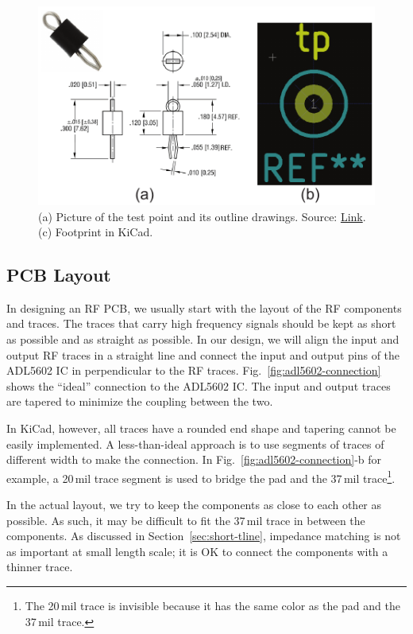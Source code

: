 \documentclass[12pt,letterpaper]{scrartcl}
\begin{document}
	\begin{figure}[ph]
		\centering
		\includegraphics[width=4.5in]{testpoint-footprint}
		\caption{(a) Picture of the test point and its outline drawings. Source: \href{http://www.digikey.com/product-detail/en/5001/5001K-ND/255327}{Link}. (c) Footprint in KiCad.}
		\label{fig:testpoint-footprint}
	\end{figure}
	
\subsection{PCB Layout}

In designing an RF PCB, we usually start with the layout of the RF components and traces. The traces that carry high frequency signals should be kept as short as possible and as straight as possible. In our design, we will align the input and output RF traces in a straight line and connect the input and output pins of the ADL5602 IC in perpendicular to the RF traces. Fig.~\ref{fig:adl5602-connection} shows the ``ideal'' connection to the ADL5602 IC. The input and output traces are tapered to minimize the coupling between the two. 

In KiCad, however, all traces have a rounded end shape and tapering cannot be easily implemented. A less-than-ideal approach is to use segments of traces of different width to make the connection. In Fig.~\ref{fig:adl5602-connection}-b for example, a 20\,mil trace segment is used to bridge the pad and the 37\,mil trace\footnote{The 20\,mil trace is invisible because it has the same color as the pad and the 37\,mil trace.}. 

In the actual layout, we try to keep the components as close to each other as possible. As such, it may be difficult to fit the 37\,mil trace in between the components. As discussed in Section~\ref{sec:short-tline}, impedance matching is not as important at small length scale; it is OK to connect the components with a thinner trace.
\end{document}
